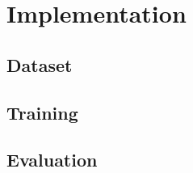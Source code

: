 \documentclass[../main.tex]{subfiles}
\begin{document}
\chapter{Implementation}

\section{Dataset}
\section{Training}
\section{Evaluation}
\end{document}
